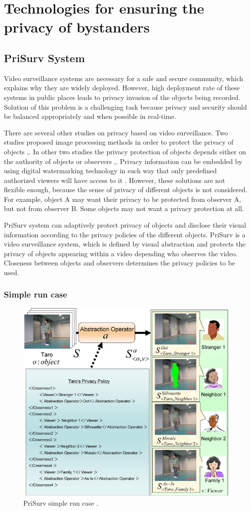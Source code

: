 \documentclass[conference]{IEEEtran}
\begin{document}
\section{Technologies for ensuring the privacy of bystanders}\label{Technologies}

\subsection{PriSurv System}
Video surveillance systems are necessary for a safe and secure community, which explains why they are widely deployed. However, high deployment rate of these systems in public places leads to privacy invasion of the objects being recorded. Solution of this problem is a challenging task because privacy and security should be balanced appropriately and when possible in real-time.

There are several other studies on privacy based on video surveillance. Two studies proposed image processing methods in order to protect the privacy of objects \cite{cavallaro2005},\cite{kitahara2004}. In other two studies the privacy protection of objects depends either on the authority of objects or observers \cite{jehan2005},\cite{senior2005}. Privacy information can be embedded by using digital watermarking technology in such way that only predefined authorized viewers will have access to it \cite{zhang2005}. However, these solutions are not flexible enough, because the sense of privacy of different objects is not considered. For example, object A may want their privacy to be protected from observer A, but not from observer B. Some objects may not want a privacy protection at all. 

PriSurv system \cite{chinomi2008PriSurv} can adaptively protect privacy of objects and disclose their visual information according to the privacy policies of the different objects. PriSurv is a video surveillance system, which is defined by visual abstraction and protects the privacy of objects appearing within a video depending who observes the video. Closeness between objects and observers determines the privacy policies to be used. 


\subsubsection{Simple run case}

\begin{figure}[t]
\centerline{\includegraphics[width=.5\textwidth]{img//prisurv_simple_demo.png}}
\caption{PriSurv simple run case \cite{chinomi2008PriSurv}.}
\label{fig:prisurv}
\end{figure}
\end{document}
